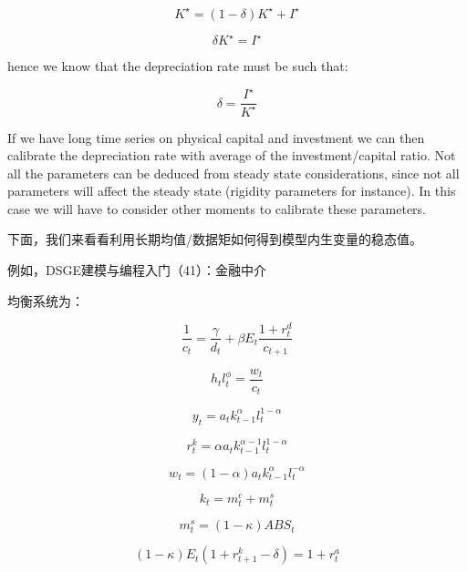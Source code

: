 \documentclass[cn,10pt,math=newtx,citestyle=gb7714-2015,bibstyle=gb7714-2015]{elegantbook}
\begin{document}
	$$K^{\star}=(1-\delta)K^{\star}+I^{\star}$$
	
	$$\delta K^{\star}=I^{\star}$$
	
	hence we know that the depreciation rate must be such that:
	
	$$\delta=\frac{I^{\star}}{K^{\star}}$$
	
	If we have long time series on physical capital and investment we can then calibrate the depreciation rate with average of the investment/capital ratio. Not all the parameters can be deduced from steady state considerations, since not all parameters will affect the steady state (rigidity parameters for instance). In this case we will have to consider other moments to calibrate these parameters.
	
	下面，我们来看看利用长期均值/数据矩如何得到模型内生变量的稳态值。
	
	例如，DSGE建模与编程入门（41）：金融中介
	
	均衡系统为：
	
	\begin{equation}\label{label}
		\frac{1}{c_t}=\frac{\gamma}{d_t}+\beta E_t\frac{1+r_t^d}{c_{t+1}}
	\end{equation}
	
	\begin{equation}\label{label}
		h_tl_t^{\phi}=\frac{w_t}{c_t}
	\end{equation}
	
	\begin{equation}\label{label}
		y_t=a_tk_{t-1}^{\alpha}l_t^{1-\alpha}
	\end{equation}
	
	\begin{equation}\label{label}
		r_t^k=\alpha a_tk_{t-1}^{\alpha-1}l_t^{1-\alpha}
	\end{equation}
	
	\begin{equation}\label{label}
		w_t=(1-\alpha)a_tk_{t-1}^{\alpha}l_t^{-\alpha}
	\end{equation}
	
	\begin{equation}\label{label}
		k_t=m_t^c+m_t^s
	\end{equation}
	
	\begin{equation}\label{label}
		m_t^s=(1-\kappa)ABS_t
	\end{equation}
	
	\begin{equation}\label{label}
		(1-\kappa)E_t(1+r_{t+1}^k-\delta)=1+r_t^a
	\end{equation}
	
\end{document}
